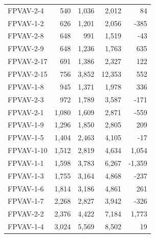 \begin{table}[]
\begin{tabular}{lrrrr}
FPVAV-2-4         & 540                      &  1,036                  & 2,012                    &  84                      \\
FPVAV-1-2         & 626                      &  1,201                  & 2,056                    &  -385                    \\
FPVAV-2-8         & 648                      &  991                    & 1,519                    &  -43                     \\
FPVAV-2-9         & 648                      &  1,236                  & 1,763                    &  635                     \\
FPVAV-2-17        & 691                      &  1,386                  & 2,327                    &  122                     \\
FPVAV-2-15        & 756                      &  3,852                  & 12,353                   &  552                     \\
FPVAV-1-8         & 945                      &  1,371                  & 1,978                    &  336                     \\
FPVAV-2-3         & 972                      &  1,789                  & 3,587                    &  -171                    \\
FPVAV-2-1         & 1,080                    &  1,609                  & 2,871                    &  -559                    \\
FPVAV-1-9         & 1,296                    &  1,850                  & 2,805                    &  209                     \\
FPVAV-1-5         & 1,404                    &  2,463                  & 4,105                    &  -17                     \\
FPVAV-1-10        & 1,512                    &  2,819                  & 4,634                    &  1,054                   \\
FPVAV-1-1         & 1,598                    &  3,783                  & 6,267                    &  -1,359                  \\
FPVAV-1-3         & 1,755                    &  3,164                  & 4,868                    &  -237                    \\
FPVAV-1-6         & 1,814                    &  3,186                  & 4,861                    &  261                     \\
FPVAV-1-7         & 2,268                    &  2,827                  & 3,942                    &  -326                    \\
FPVAV-2-2         & 2,376                    &  4,422                  & 7,184                    &  1,773                   \\
FPVAV-1-4         & 3,024                    &  5,569                  & 8,502                    &  19                      \\
    \bottomrule
\end{tabular}
\end{table}

